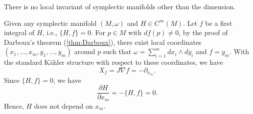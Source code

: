   \begin{corollary}
    There is no local invariant of symplectic manifolds other than the dimension.
  \end{corollary}

  Given any symplectic manifold $(M,\omega)$ and $H \in C^\infty(M)$.
  Let $f$ be a first integral of $H$, i.e., $\{H,f\} = 0$.
  For $p \in M$ with $df(p) \neq 0$, by the proof of Darboux's theorem (\cref{thm:Darboux}), there exist local coordinates $(x_1, \ldots, x_m, y_1, \ldots, y_m)$ around $p$ such that $\omega = \sum_{i=1}^m dx_i \wedge dy_i$ and $f = y_m$.
  With the standard K\"ahler structure with respect to these coordinates, we have 
  \[ X_f = J \nabla f = -\partial_{x_m}. \]
  Since $\{H,f\} = 0$, we have 
  \[ \frac{\partial H}{\partial x_m} = -\{H,f\} = 0. \]
  Hence, $H$ does not depend on $x_m$.

